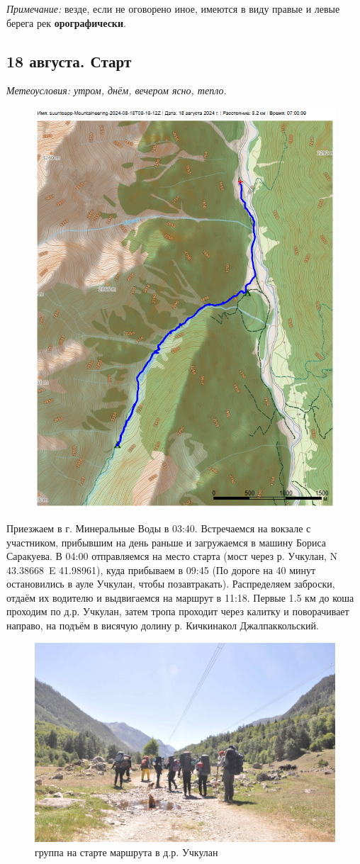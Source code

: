 \textit{Примечание:} везде, если не оговорено иное, имеются в виду правые и левые берега рек \textbf{орографически}.
\subsection{18 августа. Старт}
\textit{Метеоусловия: утром, днём, вечером ясно, тепло.}

\begin{figure}[h!]
	\centering
	\includegraphics[angle=0, width=0.7\linewidth]{../pics/mini_maps/18}
	\label{fig:mini_18}
\end{figure}


Приезжаем в г. Минеральные Воды в 03:40. Встречаемся на вокзале с участником, прибывшим на день раньше и загружаемся в машину Бориса Саракуева. В 04:00 отправляемся на место старта (мост через р. Учкулан, N 43.38668\degree~E 41.98961\degree), куда прибываем в 09:45 (По дороге на 40 минут остановились в ауле Учкулан, чтобы позавтракать). Распределяем заброски, отдаём их водителю и выдвигаемся на маршрут в 11:18. Первые 1.5 км до коша проходим по д.р. Учкулан, затем тропа проходит через калитку и поворачивает направо, на подъём в висячую долину р. Кичкинакол Джалпаккольский.

\begin{figure}[h!]
	\centering
	\includegraphics[width=0.7\linewidth]{../pics/DSC_0412}
	\caption{группа на старте маршрута в д.р. Учкулан}
	\label{fig:uchkulan}
\end{figure}


